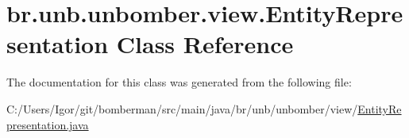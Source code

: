 \hypertarget{classbr_1_1unb_1_1unbomber_1_1view_1_1_entity_representation}{\section{br.\+unb.\+unbomber.\+view.\+Entity\+Representation Class Reference}
\label{classbr_1_1unb_1_1unbomber_1_1view_1_1_entity_representation}
}


The documentation for this class was generated from the following file\+:\begin{DoxyCompactItemize}
\item 
C\+:/\+Users/\+Igor/git/bomberman/src/main/java/br/unb/unbomber/view/\hyperlink{_entity_representation_8java}{Entity\+Representation.\+java}\end{DoxyCompactItemize}
